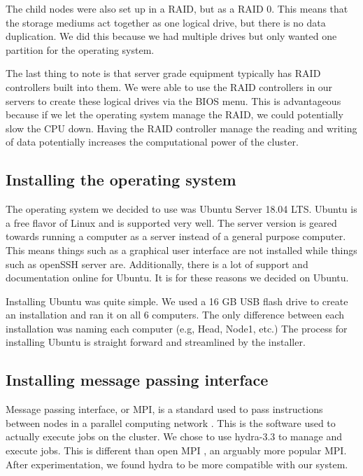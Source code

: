 \documentclass[12pt]{article}
\begin{document}
The child nodes were also set up in a RAID, but as a RAID 0. This means that the storage mediums act together as one logical drive, but there is no data duplication. We did this because we had multiple drives but only wanted one partition for the operating system.

The last thing to note is that server grade equipment typically has RAID controllers built into them. We were able to use the RAID controllers in our servers to create these logical drives via the BIOS menu. This is advantageous because if we let the operating system manage the RAID, we could potentially slow the CPU down. Having the RAID controller manage the reading and writing of data potentially increases the computational power of the cluster. 

\subsection{Installing the operating system}

The operating system we decided to use was Ubuntu Server 18.04 LTS. Ubuntu is a free flavor of Linux and is supported very well. The server version is geared towards running a computer as a server instead of a general purpose computer. This means things such as a graphical user interface are not installed while things such as openSSH server are. Additionally, there is a lot of support and documentation online for Ubuntu. It is for these reasons we decided on Ubuntu.

Installing Ubuntu was quite simple. We used a 16 GB USB flash drive to create an installation and ran it on all 6 computers. The only difference between each installation was naming each computer (e.g, Head, Node1, etc.) The process for installing Ubuntu is straight forward and streamlined by the installer.

\subsection{Installing message passing interface}

Message passing interface, or MPI, is a standard used to pass instructions between nodes in a parallel computing network \cite{mpidef}. This is the software used to actually execute jobs on the cluster. We chose to use hydra-3.3 \cite{mpi} to manage and execute jobs. This is different than open MPI \cite{openmpi}, an arguably more popular MPI. After experimentation, we found hydra to be more compatible with our system.
\end{document}

